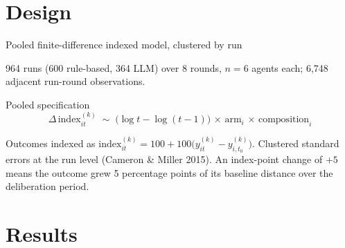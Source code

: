 \documentclass[aspectratio=169,11pt]{beamer}
\begin{document}
\section{Design}

\begin{frame}{Pooled finite-difference indexed model, clustered by run}

964 runs (600 rule-based, 364 LLM) over 8 rounds, $n=6$ agents each; 6,748 adjacent run-round observations.

\begin{exampleblock}{Pooled specification}
\[
\Delta\, \text{index}^{(k)}_{it} \;\sim\; \bigl(\log t - \log(t-1)\bigr) \,\times\, \text{arm}_i \,\times\, \text{composition}_i
\]
\end{exampleblock}

\vspace{0.2cm}
{\small Outcomes indexed as $\text{index}^{(k)}_{it} = 100 + 100\bigl(y^{(k)}_{it} - y^{(k)}_{i,t_0}\bigr)$. Clustered standard errors at the run level (Cameron \& Miller 2015). An index-point change of $+5$ means the outcome grew 5 percentage points of its baseline distance over the deliberation period.}

\end{frame}

\section{Results}
\end{document}
